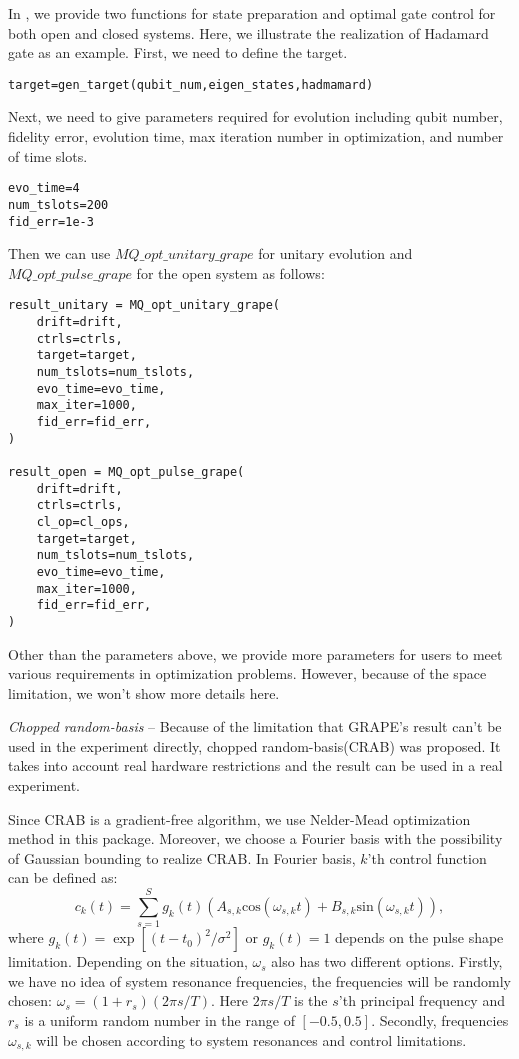 In \MindQuantum, we provide two functions for state preparation and optimal gate control for both open and closed systems. Here, we illustrate the realization of Hadamard gate as an example. First, we need to define the target.
\begin{lstlisting}
target=gen_target(qubit_num,eigen_states,hadmamard)
\end{lstlisting}
Next, we need to give parameters required for evolution including qubit number, fidelity error, evolution time, max iteration number in optimization, and number of time slots.
\begin{lstlisting}
evo_time=4
num_tslots=200
fid_err=1e-3
\end{lstlisting}
Then we can use $MQ\_opt\_unitary\_grape$ for unitary evolution and $MQ\_opt\_pulse\_grape$ for the open system as follows:
\begin{lstlisting}
result_unitary = MQ_opt_unitary_grape(
    drift=drift,
    ctrls=ctrls,
    target=target,
    num_tslots=num_tslots,
    evo_time=evo_time,
    max_iter=1000,
    fid_err=fid_err,
)

result_open = MQ_opt_pulse_grape(
    drift=drift,
    ctrls=ctrls,
    cl_op=cl_ops,
    target=target,
    num_tslots=num_tslots,
    evo_time=evo_time,
    max_iter=1000,
    fid_err=fid_err,
)
\end{lstlisting}
Other than the parameters above, we provide more parameters for users to meet various requirements in optimization problems. However, because of the space limitation, we won't show more details here.

\textit{Chopped random-basis} -- Because of the limitation that GRAPE's result can't be used in the experiment directly, chopped random-basis(CRAB) was proposed. It takes into account real hardware restrictions and the result can be used in a real experiment.

Since CRAB is a gradient-free algorithm, we use Nelder-Mead optimization method in this package. Moreover, we choose a Fourier basis with the possibility of Gaussian bounding to realize CRAB. In Fourier basis, $k$'th control function can be defined as:
\begin{equation}
    c_{k}(t)=\sum_{s=1}^{S}g_{k}(t)(A_{s,k}\mathrm{cos}(\omega_{s,k}t)+B_{s,k}\mathrm{sin}(\omega_{s,k}t)),
\end{equation}
where $g_{k}(t)=\exp\left[(t-t_{0})^{2}/\sigma^{2}\right]$ or $g_{k}(t)=1$ depends on the pulse shape limitation. Depending on the situation, $\omega_{s}$ also has two different options. Firstly, we have no idea of system resonance frequencies, the frequencies will be randomly chosen: $\omega_{s}=(1+r_s)(2\pi s/T)$. Here $2\pi s/T$ is the $s$'th principal frequency and $r_s$ is a uniform random number in the range of $[-0.5,0.5]$. Secondly, frequencies ${\omega_{s,k}}$ will be chosen according to system resonances and control limitations.

